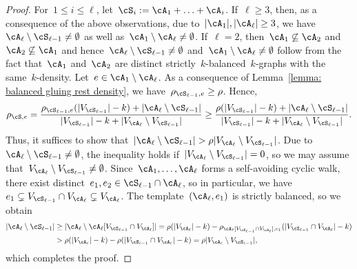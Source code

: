 \documentclass[11pt]{amsart}
\DeclarePairedDelimiter{\abs}{\lvert}{\rvert}
\theoremstyle{definition}
\numberwithin{equation}{section}
\begin{document}
\begin{proof}
		For~$1\leq i\leq\ell$, let~$\cS_i:=\cA_1+\ldots+\cA_i$.
		If~$\ell\geq 3$, then, as a consequence of the above observations, due to~$\abs{\cA_1},\abs{\cA_\ell}\geq 3$, we have~$\cA_\ell\setminus\cS_{\ell-1}\neq\emptyset$ as well as~$\cA_1\setminus\cA_\ell\neq\emptyset$.
		If~$\ell=2$, then~$\cA_1\not\subseteq\cA_2$ and~$\cA_2\not\subseteq \cA_1$ and hence~$\cA_\ell\setminus\cS_{\ell-1}\neq\emptyset$ and~$\cA_1\setminus\cA_\ell\neq\emptyset$ follow from the fact that~$\cA_1$ and~$\cA_2$ are distinct strictly~$k$-balanced~$k$-graphs with the same~$k$-density.
		Let~$e\in\cA_1\setminus\cA_\ell$.
		As a consequence of Lemma~\ref{lemma: balanced gluing rest density}, we have~$\rho_{\cS_{\ell-1},e}\geq \rho$.
		Hence,
		\begin{equation*}
			\rho_{\cS,e}
			=\frac{\rho_{\cS_{\ell-1},e}(\abs{V_{\cS_{\ell-1}}}-k)+\abs{\cA_\ell\setminus\cS_{\ell-1}} }{\abs{V_{\cS_{\ell-1}}}-k+\abs{V_{\cA_{\ell}}\setminus V_{\cS_{\ell-1}}}}
			\geq \frac{\rho(\abs{V_{\cS_{\ell-1}}}-k)+\abs{\cA_\ell\setminus\cS_{\ell-1}} }{\abs{V_{\cS_{\ell-1}}}-k+\abs{V_{\cA_{\ell}}\setminus V_{\cS_{\ell-1}}}}.
		\end{equation*}
		Thus, it suffices to show that~$\abs{\cA_\ell\setminus\cS_{\ell-1}}>\rho \abs{V_{\cA_{\ell}}\setminus V_{\cS_{\ell-1}}}$.
		Due to~$\cA_\ell\setminus\cS_{\ell-1}\neq\emptyset$, the inequality holds if~$\abs{V_{\cA_{\ell}}\setminus V_{\cS_{\ell-1}}}=0$, so we may assume that~$V_{\cA_{\ell}}\setminus V_{\cS_{\ell-1}}\neq\emptyset$.
		Since~$\cA_1,\ldots,\cA_\ell$ forms a self-avoiding cyclic walk, there exist distinct~$e_1,e_2\in\cS_{\ell-1}\cap\cA_{\ell}$, so in particular, we have~$e_1\subsetneq V_{\cS_{\ell-1}} \cap V_{\cA_\ell}\subsetneq V_{\cA_\ell}$.
		The template~$(\cA_\ell,e_1)$ is strictly balanced, so we obtain
		\begin{equation*}
			\begin{aligned}
				\abs{\cA_\ell\setminus\cS_{\ell-1}}
				&\geq \abs{\cA_\ell\setminus \cA_\ell[V_{\cS_{\ell-1}} \cap V_{\cA_\ell}] }
				=\rho(\abs{V_{\cA_\ell}}-k)-\rho_{\cA_\ell[V_{\cS_{\ell-1}}\cap V_{\cA_{\ell}}],e_1}(\abs{V_{\cS_{\ell-1}}\cap V_{\cA_{\ell}}}-k)\\
				&>\rho(\abs{V_{\cA_\ell}}-k)-\rho(\abs{V_{\cS_{\ell-1}}\cap V_{\cA_{\ell}}}-k)
				=\rho \abs{V_{\cA_\ell}\setminus V_{\cS_{\ell-1}}},
			\end{aligned}
		\end{equation*}
		which completes the proof.
	\end{proof}
	
\end{document}
